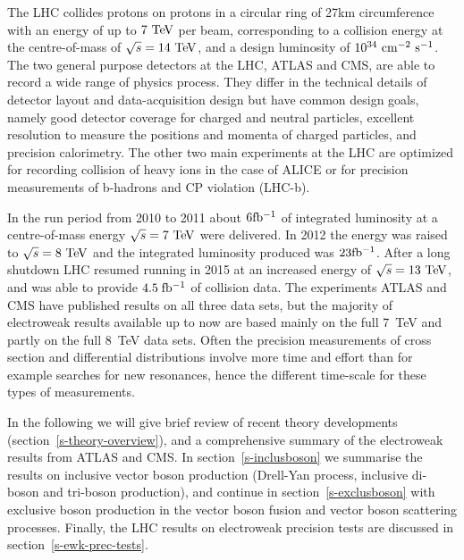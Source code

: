 The LHC collides protons on protons in a circular ring of 27\;km 
circumference with an energy of up to $7\TeV$ per beam, corresponding
to a collision energy at the centre-of-mass of $\rts=14\TeV$, and a 
design luminosity of $10^{34}\cm^{-2}\s^{-1}$. 
The two general purpose detectors at the LHC, ATLAS and CMS, are able to
record a wide range of physics process. They differ in the technical details of detector
layout and data-acquisition design but have common design goals, namely 
good detector coverage for charged and neutral particles, excellent resolution to measure
the positions and momenta of charged particles, and precision calorimetry. The other two
main experiments at the LHC are optimized for recording collision of heavy ions in the 
case of ALICE or for precision measurements of b-hadrons and CP violation (LHC-b).

In the run period from 2010 to 2011 about $6\mbox{fb$^{-1}$}$ of integrated
luminosity at a centre-of-mass energy $\rts=7\TeV$ were delivered. In 
2012 the energy was raised to $\rts=8\TeV$ and the integrated luminosity 
produced was $23\mbox{fb$^{-1}$}$. 
After a long shutdown LHC resumed running in 2015 at an increased energy of
$\rts=13\TeV$, and was able to provide $4.5\;\mbox{fb$^{-1}$}$ of collision data.
The experiments ATLAS and CMS have published results on all three data sets,
but the majority of electroweak results available up to now are based mainly
on the full 7~TeV and partly on the full 8~TeV data sets. Often the precision
measurements of cross section and differential distributions involve more time
and effort than for example searches for new resonances, hence the different
time-scale for these types of measurements. 






In the following we will give brief review 
of recent theory developments (section~\ref{s-theory-overview}), and a comprehensive
summary of the electroweak results from ATLAS and CMS. In section~\ref{s-inclusboson} we summarise the
results on inclusive vector boson production (Drell-Yan process, inclusive di-boson and tri-boson production), 
and continue in section~\ref{s-exclusboson} with exclusive boson production in the vector boson fusion and vector 
boson scattering processes. Finally, the LHC results on electroweak precision tests are discussed 
in section~\ref{s-ewk-prec-tests}. 


